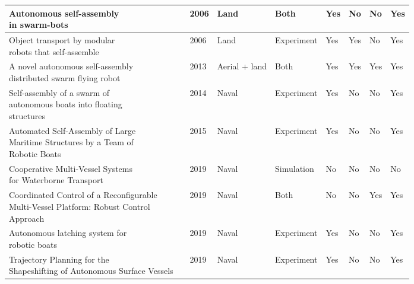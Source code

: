 \begin{tabular}{|l|l|l|l|l|l|l|l|l|}
	\makecell{Autonomous self-assembly\\  in swarm-bots} & \citet{gross2006autonomous} 	& 2006 	& Land     	& Both  	& Yes  	& No		& No & Yes	\\ \hline
	\makecell{Object transport by modular \\ robots that self-assemble}& \citet{gross2006object}& 2006& Land & Experiment & Yes  & Yes	& No   & Yes  \\ \hline
	\makecell{A novel autonomous self-assembly \\ distributed swarm flying robot}& \citet{wei2013novel}& 2013& Aerial + land & Both& Yes& Yes& Yes &Yes\\ \hline
	\makecell{Self-assembly of a swarm of \\ autonomous boats into floating \\ structures}					& \citet{o2014self}        			& 2014     	& Naval                     	& Experiment             	& Yes                  & No         				& No      &Yes		\\ \hline
	\makecell{Automated Self-Assembly of Large \\  Maritime Structures by a Team of \\ Robotic Boats}		& \citet{paulos2015automated}        	& 2015     	& Naval                     	& Experiment             	& Yes                  & No         				& No      &Yes		\\ \hline
	\makecell{Cooperative Multi-Vessel Systems \\ for Waterborne Transport}                        				& \citet{chen2019cooperative}        	& 2019          & Naval                     	& Simulation                &  No               	& No         				& No   	&No	\\ \hline
	\makecell{Coordinated Control of a Reconfigurable \\ Multi-Vessel Platform: Robust Control \\Approach}     	& \citet{park2019coordinated}        	& 2019    	& Naval                  	& Both       			&  No                	& No                        		& Yes         &Yes 	\\ \hline
	\makecell{Autonomous latching system for \\robotic boats}     										& \citet{mateos2019autonomous}       & 2019    	& Naval                  	& Experiment			&  Yes                	& No                        		& No        &Yes  	\\ \hline
	\makecell{Trajectory Planning for the  \\ Shapeshifting of Autonomous Surface Vessels}     										& \citet{8901099}       & 2019    	& Naval                  	& Experiment			&  Yes                	& No                        		& No     &Yes     	\\ \hline

\end{tabular}
